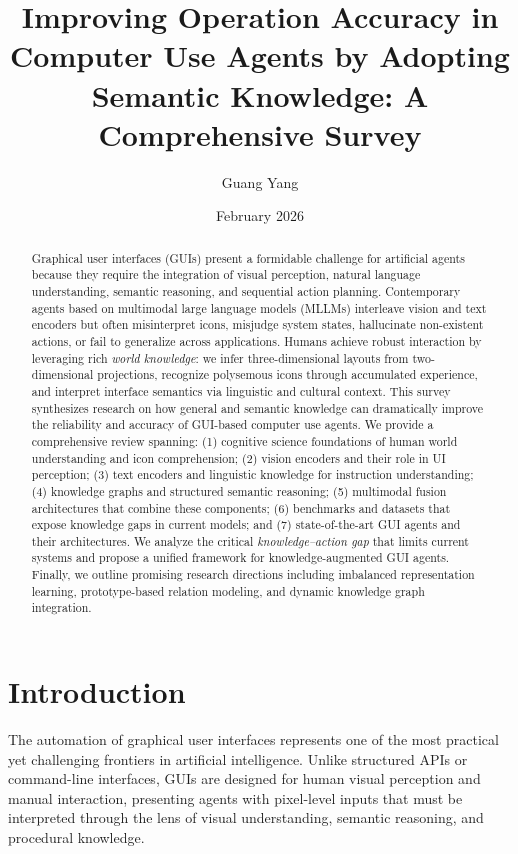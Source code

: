 \documentclass[11pt]{article}
\title{Improving Operation Accuracy in Computer Use Agents by Adopting Semantic Knowledge: A Comprehensive Survey}
\author[1]{Guang Yang}
\affil[1]{Department of Computer Science}
\date{February 2026}
\begin{document}
\maketitle

\begin{abstract}
Graphical user interfaces (GUIs) present a formidable challenge for artificial agents because they require the integration of visual perception, natural language understanding, semantic reasoning, and sequential action planning. Contemporary agents based on multimodal large language models (MLLMs) interleave vision and text encoders but often misinterpret icons, misjudge system states, hallucinate non-existent actions, or fail to generalize across applications. Humans achieve robust interaction by leveraging rich \textit{world knowledge}: we infer three-dimensional layouts from two-dimensional projections, recognize polysemous icons through accumulated experience, and interpret interface semantics via linguistic and cultural context. This survey synthesizes research on how general and semantic knowledge can dramatically improve the reliability and accuracy of GUI-based computer use agents. We provide a comprehensive review spanning: (1) cognitive science foundations of human world understanding and icon comprehension; (2) vision encoders and their role in UI perception; (3) text encoders and linguistic knowledge for instruction understanding; (4) knowledge graphs and structured semantic reasoning; (5) multimodal fusion architectures that combine these components; (6) benchmarks and datasets that expose knowledge gaps in current models; and (7) state-of-the-art GUI agents and their architectures. We analyze the critical \textit{knowledge--action gap} that limits current systems and propose a unified framework for knowledge-augmented GUI agents. Finally, we outline promising research directions including imbalanced representation learning, prototype-based relation modeling, and dynamic knowledge graph integration.
\end{abstract}

\section{Introduction}
\label{sec:intro}

The automation of graphical user interfaces represents one of the most practical yet challenging frontiers in artificial intelligence. Unlike structured APIs or command-line interfaces, GUIs are designed for human visual perception and manual interaction, presenting agents with pixel-level inputs that must be interpreted through the lens of visual understanding, semantic reasoning, and procedural knowledge.
\end{document}
